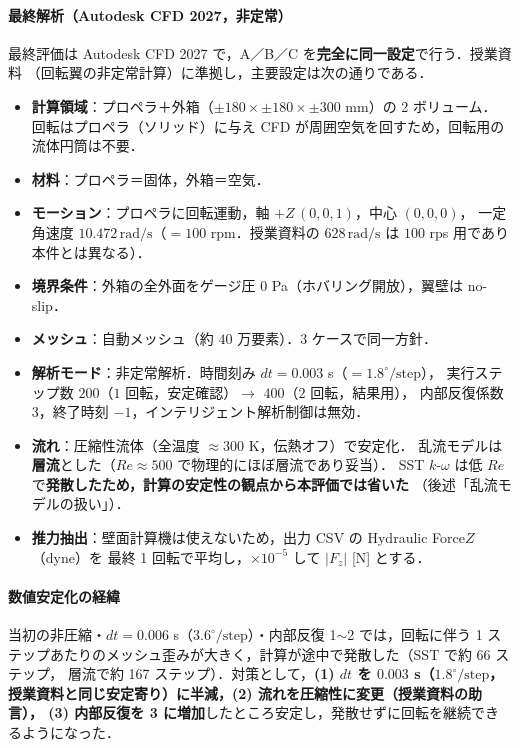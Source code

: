 \documentclass[a4paper,11pt]{jsarticle}
\begin{document}
\paragraph{最終解析（Autodesk CFD 2027，非定常）}
最終評価は Autodesk CFD 2027 で，A／B／C を\textbf{完全に同一設定}で行う．授業資料
（回転翼の非定常計算）に準拠し，主要設定は次の通りである．

\begin{itemize}
  \item \textbf{計算領域}：プロペラ＋外箱（$\pm180\times\pm180\times\pm300$ mm）の 2 ボリューム．
        回転はプロペラ（ソリッド）に与え CFD が周囲空気を回すため，回転用の流体円筒は不要．
  \item \textbf{材料}：プロペラ＝固体，外箱＝空気．
  \item \textbf{モーション}：プロペラに回転運動，軸 $+Z\,(0,0,1)$，中心 $(0,0,0)$，
        一定角速度 $\bm{10.472\,\mathrm{rad/s}}$（$=100$ rpm．授業資料の $628\,\mathrm{rad/s}$ は
        $100$ rps 用であり本件とは異なる）．
  \item \textbf{境界条件}：外箱の全外面をゲージ圧 $0$ Pa（ホバリング開放），翼壁は no-slip．
  \item \textbf{メッシュ}：自動メッシュ（約 $40$ 万要素）．3 ケースで同一方針．
  \item \textbf{解析モード}：非定常解析．時間刻み $dt=\bm{0.003}$ s（$=1.8^\circ/\mathrm{step}$），
        実行ステップ数 $200$（$1$ 回転，安定確認）$\to$ $400$（$2$ 回転，結果用），
        内部反復係数 $3$，終了時刻 $-1$，インテリジェント解析制御は無効．
  \item \textbf{流れ}：圧縮性流体（全温度 $\approx300$ K，伝熱オフ）で安定化．
        乱流モデルは\textbf{層流}とした（$Re\approx500$ で物理的にほぼ層流であり妥当）．
        SST $k\text{-}\omega$ は低 $Re$ で\textbf{発散したため，計算の安定性の観点から本評価では省いた}
        （後述「乱流モデルの扱い」）．
  \item \textbf{推力抽出}：壁面計算機は使えないため，出力 CSV の Hydraulic Force$Z$（dyne）を
        最終 1 回転で平均し，$\times10^{-5}$ して $|F_z|$ [N] とする．
\end{itemize}

\paragraph{数値安定化の経緯}
当初の非圧縮・$dt=0.006$ s（$3.6^\circ/\mathrm{step}$）・内部反復 1$\sim$2 では，回転に伴う
1 ステップあたりのメッシュ歪みが大きく，計算が途中で発散した（SST で約 66 ステップ，
層流で約 167 ステップ）．対策として，\textbf{(1) $dt$ を $0.003$ s（$1.8^\circ/\mathrm{step}$，
授業資料と同じ安定寄り）に半減，(2) 流れを圧縮性に変更（授業資料の助言），
(3) 内部反復を 3 に増加}したところ安定し，発散せずに回転を継続できるようになった．
\end{document}
